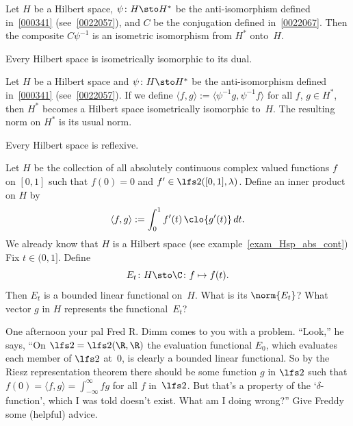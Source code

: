 \begin{prop}\label{0022071} Let $H$ be a Hilbert space, $\psi\colon H \sto H^*$ be the
anti-isomorphism defined in~\ref{000341} (see~\ref{0022057}), and $C$ be the conjugation
defined in~\ref{0022067}. Then the composite $C \psi^{-1}$ is an isometric isomorphism
from $H^*$ onto~$H$.
\end{prop}

\begin{cor}\label{cor_Hsp_iso_dual} Every Hilbert space is isometrically isomorphic to its dual.
\end{cor}

\begin{prop} Let $H$ be a Hilbert space and $\psi\colon H \sto H^*$ be the anti-isomorphism
defined in~\ref{000341} (see~\ref{0022057}).  If we define $\langle f,g \rangle :=
\langle \psi^{-1}g, \psi^{-1}f \rangle$ for all $f$, $g \in H^*$, then $H^*$ becomes a
Hilbert space isometrically isomorphic to~$H$.  The resulting norm on $H^*$ is its usual
norm.
\end{prop}

\begin{cor} Every Hilbert space is reflexive.
\end{cor}

\begin{exam} Let $H$ be the collection of all absolutely continuous complex
valued functions $f$ on $[0,1]$ such that $f(0) = 0$ and $f' \in
\lfs 2([0,1],\lambda)$.  Define an inner product on $H$ by
 \[\langle f,g \rangle := \int_0^1 f'(t)\,\clo{g'(t)}\,dt.\]
We already know that $H$ is a Hilbert space (see example~\ref{exam_Hsp_abs_cont})
Fix $t \in (0,1]$.  Define
   \[ E_t\colon H \sto \C\colon f \mapsto f(t). \]
Then $E_t$ is a bounded linear functional on~$H$. What is its $\norm{E_t}$?
What vector $g$ in $H$ represents the functional~$E_t$?
\end{exam}

\begin{exer} One afternoon your pal Fred R. Dimm comes to you with a problem. ``Look,'' he says,
``On $\lfs 2 = \lfs 2(\R,\R)$ the evaluation functional $E_0$, which evaluates each member of $\lfs 2$
at~$0$, is clearly a bounded linear functional.  So by the Riesz representation theorem there
should be some function $g$ in $\lfs 2$ such that $f(0) = \langle f,g \rangle = \int_{-\infty}^\infty fg$
for all $f$ in~$\lfs 2$.  But that's a property of the `$\delta$-function', which I was told
doesn't exist.  What am I doing wrong?'' Give Freddy some (helpful) advice.
\end{exer}

